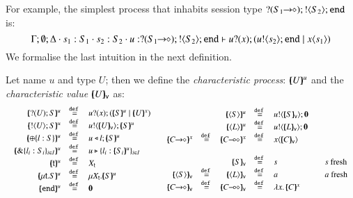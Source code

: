 For example, the simplest process that inhabits 
session type $? (S_1\!\! \rightarrow\!\! \diamond) ; ! \langle S_2 \rangle ; \mathtt{end}$ 
is:
%
\[
	\Gamma; \emptyset; \Delta \cdot s_1: S_1 \cdot s_2: S_2 \cdot u: ? (S_1\!\! \rightarrow\!\! \diamond) ; ! \langle S_2 \rangle ; \mathtt{end} \vdash u ? (x) ; (u ! \langle s_2 \rangle ; \mathtt{end} \;|\; x\langle s_1 \rangle)
\]
%
\noi 
We formalise the last intuition in the next definition.
%
\begin{definition}\rm
	\label{def:characteristic_process}
	\noi Let name $u$ and type $U$; then we define the {\em characteristic process}:
	$[\!\!(U)\!\!]^{u}$ and the {\em characteristic value} $[\!\!(U)\!\!]_{\mathsf{v}}$ as:
%
	\[
	\begin{array}{cc}
		\begin{array}{rclcl}
			\mapchar{\btinp{U} S}{u} &\defeq& \binp{u}{x} (\mapchar{S}{u} \Par \mapchar{U}{x})
			\\
			\mapchar{\btout{U} S}{u} &\defeq& \bout{u}{\omapchar{U}} \mapchar{S}{u} %
			\\
			\mapchar{\btsel{l : S}}{u} &\defeq& \bsel{u}{l} \mapchar{S}{u}
			\\
			\mapchar{\btbra{l_i: S_i}_{i \in I}}{u} &\defeq& \bbra{u}{l_i: \mapchar{S_i}{u}}_{i \in I}
			\\
			\mapchar{\tvar{t}}{u} &\defeq& \varp{X}_{\vart{t}}
			\\
			\mapchar{\trec{t}{S}}{u} &\defeq& \recp{X_{\vart{t}}}{\mapchar{S}{u}}
			\\
			\mapchar{\tinact}{u} &\defeq& \inact
			\\
		\end{array}
		&
		\begin{array}{rcrclcl}
			&&\mapchar{\chtype{S}}{u} &\defeq& \bout{u}{\omapchar{S}} \inact
			\\
			&&\mapchar{\chtype{L}}{u} &\defeq& \bout{u}{\omapchar{L}} \inact
			\\
			\mapchar{\shot{C}}{x} &\defeq& \mapchar{\lhot{C}}{x} &\defeq& \appl{x}{\omapchar{C}}
			\\
			\\
			&&\omapchar{S} &\defeq& s && s \textrm{ fresh}
			\\
			\omapchar{\chtype{S}} &\defeq& \omapchar{\chtype{L}} &\defeq& a && a \textrm{ fresh}
			\\
			\omapchar{\shot{C}} &\defeq& \omapchar{\lhot{C}} &\defeq& \abs{x}{\mapchar{C}{x}}
		\end{array}
	\end{array}
	\]
\end{definition}
%

